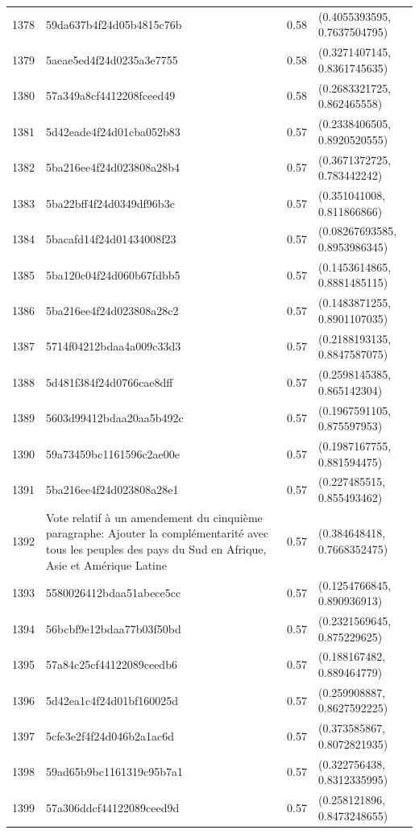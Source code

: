 \begin{table}[ht]
\begin{tabular}{rlrl}
  1378 & 59da637b4f24d05b4815c76b & 0.58 & (0.4055393595, 0.7637504795) \\ 
  1379 & 5aeae5ed4f24d0235a3e7755 & 0.58 & (0.3271407145, 0.8361745635) \\ 
  1380 & 57a349a8cf4412208fceed49 & 0.58 & (0.2683321725, 0.862465558) \\ 
  1381 & 5d42eade4f24d01cba052b83 & 0.57 & (0.2338406505, 0.8920520555) \\ 
  1382 & 5ba216ee4f24d023808a28b4 & 0.57 & (0.3671372725, 0.783442242) \\ 
  1383 & 5ba22bff4f24d0349df96b3c & 0.57 & (0.351041008, 0.811866866) \\ 
  1384 & 5bacafd14f24d01434008f23 & 0.57 & (0.08267693585, 0.8953986345) \\ 
  1385 & 5ba120c04f24d060b67fdbb5 & 0.57 & (0.1453614865, 0.8881485115) \\ 
  1386 & 5ba216ee4f24d023808a28c2 & 0.57 & (0.1483871255, 0.8901107035) \\ 
  1387 & 5714f04212bdaa4a009c33d3 & 0.57 & (0.2188193135, 0.8847587075) \\ 
  1388 & 5d481f384f24d0766cae8dff & 0.57 & (0.2598145385, 0.865142304) \\ 
  1389 & 5603d99412bdaa20aa5b492c & 0.57 & (0.1967591105, 0.875597953) \\ 
  1390 & 59a73459bc1161596c2ae00e & 0.57 & (0.1987167755, 0.881594475) \\ 
  1391 & 5ba216ee4f24d023808a28e1 & 0.57 & (0.227485515, 0.855493462) \\ 
  1392 & Vote relatif à un amendement du cinquième paragraphe: Ajouter la complémentarité avec tous les peuples des pays du Sud en Afrique, Asie et Amérique Latine & 0.57 & (0.384648418, 0.7668352475) \\ 
  1393 & 5580026412bdaa51abece5cc & 0.57 & (0.1254766845, 0.890936913) \\ 
  1394 & 56bcbf9e12bdaa77b03f50bd & 0.57 & (0.2321569645, 0.875229625) \\ 
  1395 & 57a84c25cf44122089ceedb6 & 0.57 & (0.188167482, 0.889464779) \\ 
  1396 & 5d42ea1c4f24d01bf160025d & 0.57 & (0.259908887, 0.8627592225) \\ 
  1397 & 5cfe3e2f4f24d046b2a1ac6d & 0.57 & (0.373585867, 0.8072821935) \\ 
  1398 & 59ad65b9bc1161319c95b7a1 & 0.57 & (0.322756438, 0.8312335995) \\ 
  1399 & 57a306ddcf44122089ceed9d & 0.57 & (0.258121896, 0.8473248655) \\ 

\end{tabular}
\end{table}
